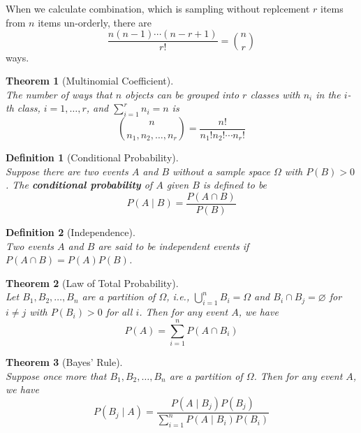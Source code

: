 \documentclass[12pt]{article}
\newtheorem{definition}{Definition}[section]
\newtheorem{theorem}{Theorem}[section]
\theoremstyle{definition}
\begin{document}
When we calculate combination, which is sampling without replcement $r$ items from $n$ items un-orderly,
there are
\[
\frac{n(n-1)\cdots(n-r+1)}{r!}=\binom{n}{r}
\]
ways.
\begin{theorem}[Multinomial Coefficient]
\hfill\\\normalfont The number of ways that $n$ objects can be grouped into $r$ classes with $n_i$ in the $i$-th class, $i=1,\ldots, r$, and $\sum_{i=1}^r n_i=n$ is
\[
\binom{n}{n_1,n_2,\ldots, n_r} = \frac{n!}{n_1!n_2!\cdots n_r!}
\]
\end{theorem}
\begin{definition}[Conditional Probability]
\hfill\\\normalfont Suppose there are two events $A$ and $B$ without a sample space $\Omega$ with $P(B)>0$. The \textbf{conditional probability} of $A$ given $B$ is defined to be
\[
P(A\mid B) = \frac{P(A\cap B)}{P(B)}
\]
\end{definition}
\begin{definition}[Independence]
\hfill\\\normalfont Two events $A$ and $B$ are said to be independent events if $P(A\cap B)=P(A)P(B)$.
\end{definition}
\begin{theorem}[Law of Total Probability]
\hfill\\\normalfont Let $B_1, B_2, \ldots, B_n$ are a partition of $\Omega$, i.e., $\bigcup_{i=1}^n B_i=\Omega$ and $B_i\cap B_j=\varnothing$ for $i\neq j$ with $P(B_i)>0$ for all $i$. Then for any event $A$, we have
\[
P(A)=\sum_{i=1}^n P(A\cap B_i)
\]
\end{theorem}
\begin{theorem}[Bayes' Rule]
\hfill\\\normalfont Suppose once more that $B_1, B_2,\ldots, B_n$ are a partition of $\Omega$. Then for any event $A$, we have
\[
P(B_j\mid A) = \frac{P(A\mid B_j)P(B_j)}{\sum_{i=1}^n P(A\mid B_i)P(B_i)}
\]
\end{theorem}
\end{document}
